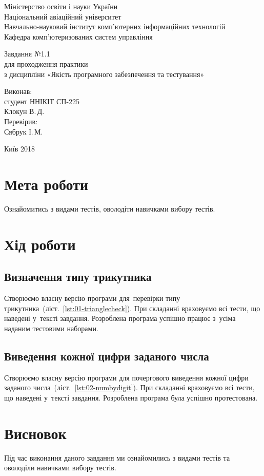 \documentclass[a4paper,oneside,BCOR=1cm,DIV=12,12pt,headings=normal]{scrartcl}
\newcommand{\allcaps}[1]{{\addfontfeatures{LetterSpace = 3}#1}}
\begin{document}
	\begin{titlepage}
	\centering
		Міністерство освіти і науки України\\
		Національний авіаційний університет\\
		Навчально-науковий інститут комп'ютерних інформаційних технологій\\
		Кафедра комп'ютеризованих систем управління

		\vspace*{\fill}

		Завдання №1{.}1\\
		для проходження практики\\
		з дисципліни «Якість програмного забезпечення та тестування»\\

		\vspace*{\fill}
		
		\begin{flushright}
			Виконав:\\
			студент \allcaps{ННІКІТ} \allcaps{СП}-225\\
			Клокун В.\,Д.\\
			Перевірив:\\
			Сябрук І.\,М.
		\end{flushright}

		Київ 2018
    \end{titlepage}

	\section{Мета роботи}
		Ознайомитись з видами тестів, оволодіти навичками вибору тестів.

	\section{Хід роботи}
		\subsection{Визначення типу трикутника}
			Створюємо власну версію програми для~перевірки типу трикутника~(ліст.~\ref{lst:01-trianglecheck}). При складанні враховуємо всі тести, що наведені у~тексті завдання. Розроблена програма успішно працює з~усіма наданим тестовими наборами.

			
		\subsection{Виведення кожної цифри заданого числа}
			Створюємо власну версію програми для почергового виведення кожної цифри заданого числа~(ліст.~\ref{lst:02-numbydigit}). При складанні враховуємо всі тести, що наведені у~тексті завдання. Розроблена програма була успішно протестована.


	\section{Висновок}
		Під час виконання даного завдання ми ознайомились з видами тестів та оволоділи навичками вибору тестів.
\end{document}
